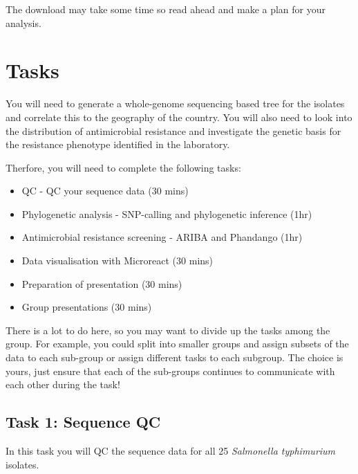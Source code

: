 \documentclass[11pt]{article}
\providecommand{\tightlist}{%
      \setlength{\itemsep}{0pt}\setlength{\parskip}{0pt}}
\begin{document}
The download may take some time so read ahead and make a plan for your
analysis.

    \hypertarget{tasks}{%
\section{Tasks}\label{tasks}}

You will need to generate a whole-genome sequencing based tree for the
isolates and correlate this to the geography of the country. You will
also need to look into the distribution of antimicrobial resistance and
investigate the genetic basis for the resistance phenotype identified in
the laboratory.

Therfore, you will need to complete the following tasks:

\begin{itemize}
\tightlist
\item
  QC - QC your sequence data (30 mins)
\item
  Phylogenetic analysis - SNP-calling and phylogenetic inference (1hr)
\item
  Antimicrobial resistance screening - ARIBA and Phandango (1hr)
\item
  Data visualisation with Microreact (30 mins)
\item
  Preparation of presentation (30 mins)
\item
  Group presentations (30 mins)
\end{itemize}

There is a lot to do here, so you may want to divide up the tasks among
the group. For example, you could split into smaller groups and assign
subsets of the data to each sub-group or assign different tasks to each
subgroup. The choice is yours, just ensure that each of the sub-groups
continues to communicate with each other during the task!

    \hypertarget{task-1-sequence-qc}{%
\subsection{Task 1: Sequence QC}\label{task-1-sequence-qc}}

In this task you will QC the sequence data for all 25 \textit{Salmonella
typhimurium} isolates.
\end{document}
